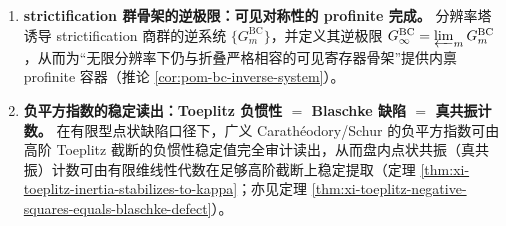 \begin{enumerate}
  \item \textbf{strictification 群骨架的逆极限：可见对称性的 profinite 完成。}
  分辨率塔诱导 strictification 商群的逆系统 \(\{G^{\mathrm{BC}}_m\}\)，并定义其逆极限 \(G^{\mathrm{BC}}_\infty=\varprojlim_m G^{\mathrm{BC}}_m\)，从而为“无限分辨率下仍与折叠严格相容的可见寄存器骨架”提供内禀 profinite 容器（推论 \ref{cor:pom-bc-inverse-system}）。

  \item \textbf{负平方指数的稳定读出：Toeplitz 负惯性 \(=\) Blaschke 缺陷 \(=\) 真共振计数。}
  在有限型点状缺陷口径下，广义 Carath\'eodory/Schur 的负平方指数可由高阶 Toeplitz 截断的负惯性稳定值完全审计读出，从而盘内点状共振（真共振）计数可由有限维线性代数在足够高阶截断上稳定提取（定理 \ref{thm:xi-toeplitz-inertia-stabilizes-to-kappa}；亦见定理 \ref{thm:xi-toeplitz-negative-squares-equals-blaschke-defect}）。
\end{enumerate}

